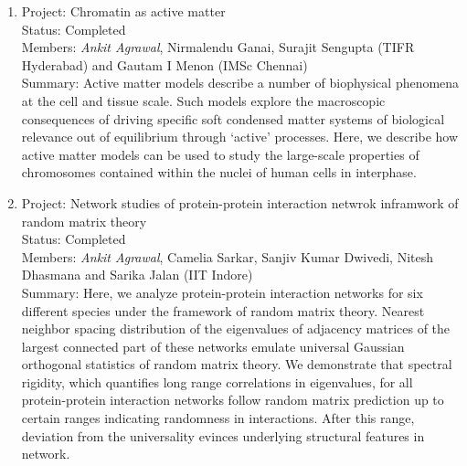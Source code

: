 \documentclass{res}
\begin{document}
\begin{resume}
\begin{enumerate}
\item Project: Chromatin as active matter   \\
 Status: Completed  \\
 Members: \emph{Ankit Agrawal}, Nirmalendu Ganai, Surajit Sengupta (TIFR Hyderabad) and Gautam I Menon (IMSc Chennai) \\
 Summary: Active matter models describe a number of biophysical phenomena at the cell and tissue scale. Such models explore the macroscopic consequences
of driving specific soft condensed matter systems of biological relevance out of equilibrium through ‘active’ processes. Here, we describe how active matter
models can be used to study the large-scale properties of chromosomes contained within the nuclei of human cells in interphase. \\


\item Project: Network studies of protein-protein interaction netwrok inframwork of random matrix theory  \\ 
 Status: Completed  \\
 Members: \emph{Ankit Agrawal}, Camelia Sarkar, Sanjiv Kumar Dwivedi, Nitesh Dhasmana and Sarika Jalan (IIT Indore) \\ 
 Summary: Here, we analyze protein-protein interaction networks for six different species under the
framework of random matrix theory. Nearest neighbor spacing distribution of the
eigenvalues of adjacency matrices of the largest connected part of these networks emulate
universal Gaussian orthogonal statistics of random matrix theory. We demonstrate
that spectral rigidity, which quantifies long range correlations in eigenvalues, for all
protein-protein interaction networks follow random matrix prediction up to certain ranges
indicating randomness in interactions. After this range, deviation from the universality
evinces underlying structural features in network. \\


\end{enumerate}







\end{resume}

\end{document}
